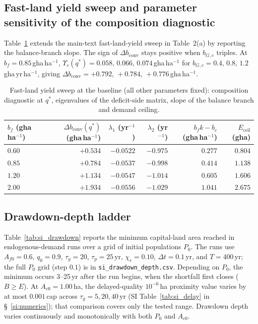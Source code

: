 \documentclass[11pt,a4paper]{article}
\newcommand{\dconv}{\Delta b_{\mathrm{conv}}}
\newcommand{\Ups}{\Upsilon_c}
\newcommand{\Eceil}{E_{\mathrm{ceil}}}
\begin{document}
\subsection{Fast-land yield sweep and parameter sensitivity of the composition diagnostic}\label{si:sweep}

Table~\ref{tab:si_sweep} extends the main-text fast-land-yield sweep in Table~2(a) by reporting the balance-branch slope. The sign of $\dconv$ stays positive when $b_{G,c}$ triples. At $b_f=0.85$\,gha\,ha$^{-1}$, $\Ups(q^*)=0.058,\,0.066,\,0.074$\,gha\,ha$^{-1}$ for $b_{G,c}=0.4,\,0.8,\,1.2$\,gha\,yr\,ha$^{-1}$, giving $\dconv=+0.792,\,+0.784,\,+0.776$\,gha\,ha$^{-1}$.

\begin{table}[htbp]
\centering\small
\caption{Fast-land yield sweep at the baseline (all other parameters fixed): composition diagnostic at $q^*$, eigenvalues of the deficit-side matrix, slope of the balance branch and demand ceiling.}
\label{tab:si_sweep}
\begin{tabular}{l r r r r r}
\toprule
$b_f$ (gha\,ha$^{-1}$) & $\dconv(q^*)$ (gha\,ha$^{-1}$) & $\lambda_1$ (yr$^{-1}$) & $\lambda_2$ (yr$^{-1}$) & $b_fk-b_c$ (gha\,ha$^{-1}$) & $\Eceil$ (gha) \\
\midrule
$0.60$ & $+0.534$ & $-0.0522$ & $-0.975$ & $0.277$ & $0.804$ \\
$0.85$ & $+0.784$ & $-0.0537$ & $-0.998$ & $0.414$ & $1.138$ \\
$1.20$ & $+1.134$ & $-0.0547$ & $-1.014$ & $0.605$ & $1.606$ \\
$2.00$ & $+1.934$ & $-0.0556$ & $-1.029$ & $1.041$ & $2.675$ \\
\bottomrule
\end{tabular}
\end{table}

\subsection{Drawdown-depth ladder}\label{si:ladder}

Table~\ref{tab:si_drawdown} reports the minimum capital-land area reached in endogenous-demand runs over a grid of initial populations $P_0$. The runs use $A_{f0}=0.6$, $q_0=0.9$, $\tau_g=20$, $\tau_p=25$\,yr, $\chi_r=0.10$, $\Delta t=0.1$\,yr, and $T=400$\,yr; the full $P_0$ grid (step $0.1$) is in \texttt{si\_drawdown\_depth.csv}. Depending on $P_0$, the minimum occurs 3--25\,yr after the run begins, when the shortfall first closes ($B\ge E$). At $A_{c0}=1.00$\,ha, the delayed-quality $10^{-6}$\,ha proximity value varies by at most $0.001$\,cap across $\tau_g=5,20,40$\,yr (SI Table~\ref{tab:si_delay} in \S~\ref{si:numerics}); that comparison covers only the tested range. Drawdown depth varies continuously and monotonically with both $P_0$ and $A_{c0}$.
\end{document}
